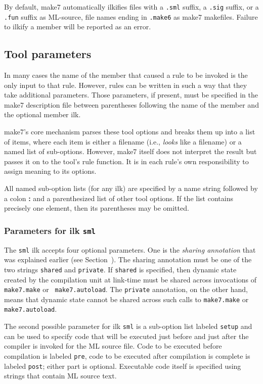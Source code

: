 By default, make7 automatically ilkifies files with a {\tt .sml}
suffix, a {\tt .sig} suffix, or a {\tt .fun} suffix as ML-source, file
names ending in {\tt .make6} as make7 makefiles.  Failure to ilkify a
member will be reported as an error.

\subsection{Tool parameters}
\label{sec:toolparam}

In many cases the name of the member that caused a rule to be invoked
is the only input to that rule.  However, rules can be written in such
a way that they take additional parameters.  Those parameters, if
present, must be specified in the make7 description file between
parentheses following the name of the member and the optional member
ilk.

make7's core mechanism parses these tool options and breaks them up into
a list of items, where each item is either a filename (i.e., {\em
looks} like a filename) or a named list of sub-options.  However, make7
itself does not interpret the result but passes it on to the tool's
rule function.  It is in each rule's own responsibility to assign
meaning to its options.

All named sub-option lists (for any ilk) are specified by a name
string followed by a colon {\bf :} and a parenthesized list of other
tool options.  If the list contains precisely one element, then its
parentheses may be omitted.

\subsubsection{Parameters for ilk {\tt sml}}
\label{sec:toolparam:sml}

The {\tt sml} ilk accepts four optional parameters.  One is the {\em
sharing annotation} that was explained earlier (see
Section~).  The sharing annotation must be one of the
two strings {\tt shared} and {\tt private}.  If {\tt shared} is
specified, then dynamic state created by the compilation unit at
link-time must be shared across invocations of {\tt make7.make} or {\tt
make7.autoload}.  The {\tt private} annotation, on the other hand, means
that dynamic state cannot be shared across such calls to {\tt make7.make}
or {\tt make7.autoload}.

The second possible parameter for ilk {\tt sml} is a sub-option
list labeled {\tt setup} and can be used to specify code that will be
executed just before and just after the compiler is invoked for the
ML source file.  Code to be executed before compilation is labeled
{\tt pre}, code to be executed after compilation is complete is
labeled {\tt post}; either part is optional.  Executable code itself
is specified using strings that contain ML source text.

